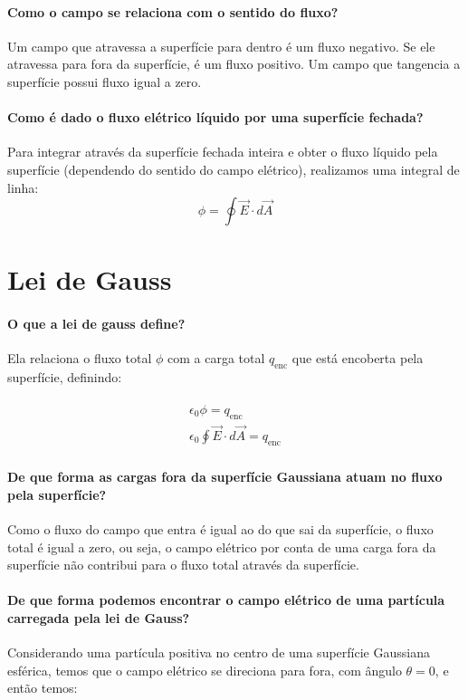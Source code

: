   \paragraph{Como o campo se relaciona com o sentido do fluxo?} Um campo que atravessa a superfície para dentro é um fluxo negativo. Se ele atravessa para fora da superfície, é um fluxo positivo. Um campo que tangencia a superfície possui fluxo igual a zero.

  \paragraph{Como é dado o fluxo elétrico líquido por uma superfície fechada?} Para integrar através da superfície fechada inteira e obter o fluxo líquido pela superfície (dependendo do sentido do campo elétrico), realizamos uma integral de linha:
  \[
    \phi = \oint \vec{E} \cdot d \vec{A}
  \]
\section*{Lei de Gauss}
  
  \paragraph{O que a lei de gauss define?} Ela relaciona o fluxo total $ \phi $ com a carga total $ q_{\text{enc}} $ que está encoberta pela superfície, definindo:

  \begin{gather}
    \begin{align}
      \epsilon_0 \phi = q_{\text{enc}} \\
      \epsilon_0 \oint \vec{E} \cdot d \vec{A} = q_{\text{enc}}
    \end{align}
  \end{gather}

  \paragraph{De que forma as cargas fora da superfície Gaussiana atuam no fluxo pela superfície?} Como o fluxo do campo que entra é igual ao do que sai da superfície, o fluxo total é igual a zero, ou seja, o campo elétrico por conta de uma carga fora da superfície não contribui para o fluxo total através da superfície.

  \paragraph{De que forma podemos encontrar o campo elétrico de uma partícula carregada pela lei de Gauss?} Considerando uma partícula positiva no centro de uma superfície Gaussiana esférica, temos que o campo elétrico se direciona para fora, com ângulo $ \theta = 0 $, e então temos:

